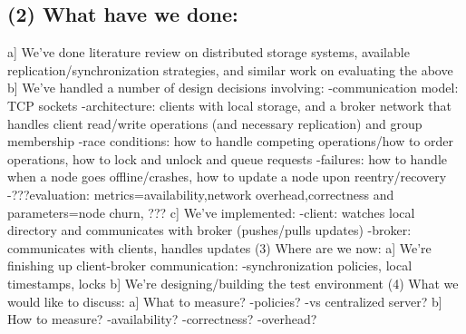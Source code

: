 \subsection{(2) What have we done:}
  a] We've done literature review on distributed storage systems, available replication/synchronization strategies, and similar work on evaluating the above
    b] We've handled a number of design decisions involving:
          -communication model: TCP sockets
                -architecture: clients with local storage, and a broker network that handles client read/write operations (and necessary replication) and group membership
                      -race conditions: how to handle competing operations/how to order operations, how to lock and unlock and queue requests
                            -failures: how to handle when a node goes offline/crashes, how to update a node upon reentry/recovery
                                  -???evaluation: metrics=availability,network overhead,correctness and parameters=node churn, ???
                                    c] We've implemented:
                                          -client: watches local directory and communicates with broker (pushes/pulls updates)
                                                -broker: communicates with clients, handles updates
                                                (3) Where are we now:
                                                  a] We're finishing up client-broker communication:
                                                        -synchronization policies, local timestamps, locks
                                                          b] We're designing/building the test environment
                                                          (4) What we would like to discuss:
                                                            a] What to measure?
                                                                  -policies?
                                                                        -vs centralized server?
                                                                          b] How to measure?
                                                                                -availability?
                                                                                      -correctness?
                                                                                            -overhead?
